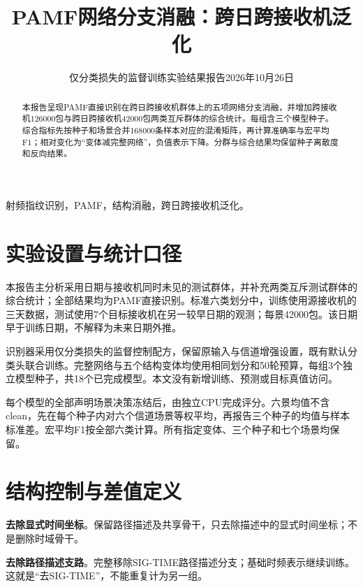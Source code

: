 \documentclass[10pt,journal]{IEEEtran}
\begin{document}
\title{PAMF网络分支消融：跨日跨接收机泛化}

\author{仅分类损失的监督训练\quad 实验结果报告\quad 2026年10月26日}

\maketitle

\begin{abstract}
本报告呈现PAMF直接识别在跨日跨接收机群体上的五项网络分支消融，并增加跨接收机126000包与跨日跨接收机42000包两类互斥群体的综合统计。每组含三个模型种子。综合指标先按种子和场景合并168000条样本对应的混淆矩阵，再计算准确率与宏平均F1；相对变化为“变体减完整网络”，负值表示下降。分群与综合结果均保留种子离散度和反向结果。
\end{abstract}

\begin{IEEEkeywords}射频指纹识别，PAMF，结构消融，跨日跨接收机泛化。\end{IEEEkeywords}

\section{实验设置与统计口径}

本报告主分析采用日期与接收机同时未见的测试群体，并补充两类互斥测试群体的综合统计；全部结果均为PAMF直接识别。标准六类划分中，训练使用源接收机的三天数据，测试使用7个目标接收机在另一较早日期的观测；每景42000包。该日期早于训练日期，不解释为未来日期外推。

识别器采用仅分类损失的监督控制配方，保留原输入与信道增强设置，既有默认分类头联合训练。完整网络与五个结构变体均使用相同划分和50轮预算，每组3个独立模型种子，共18个已完成模型。本文没有新增训练、预测或目标真值访问。

每个模型的全部声明场景决策冻结后，由独立CPU完成评分。六景均值不含clean，先在每个种子内对六个信道场景等权平均，再报告三个种子的均值与样本标准差。宏平均F1按全部六类计算。所有指定变体、三个种子和七个场景均保留。

\section{结构控制与差值定义}

\noindent\textbf{去除显式时间坐标}。保留路径描述及共享骨干，只去除描述中的显式时间坐标；不是删除时域骨干。\par

\noindent\textbf{去除路径描述支路}。完整移除SIG-TIME路径描述分支；基础时频表示继续训练。这就是“去SIG-TIME”，不能重复计为另一组。\par
\end{document}
